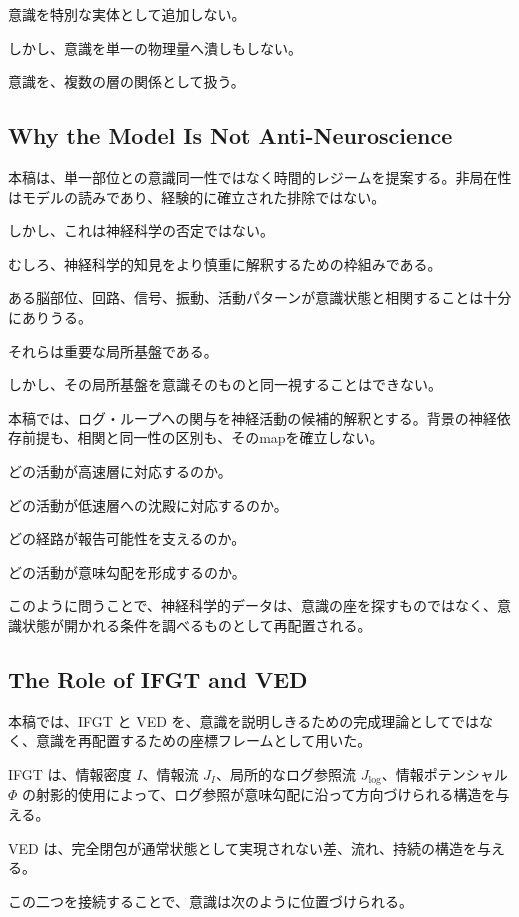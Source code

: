 意識を特別な実体として追加しない。

しかし、意識を単一の物理量へ潰しもしない。

意識を、複数の層の関係として扱う。

\subsection{Why the Model Is Not Anti-Neuroscience}

本稿は、単一部位との意識同一性ではなく時間的レジームを提案する。非局在性はモデルの読みであり、経験的に確立された排除ではない。

しかし、これは神経科学の否定ではない。

むしろ、神経科学的知見をより慎重に解釈するための枠組みである。

ある脳部位、回路、信号、振動、活動パターンが意識状態と相関することは十分にありうる。

それらは重要な局所基盤である。

しかし、その局所基盤を意識そのものと同一視することはできない。

本稿では、ログ・ループへの関与を神経活動の候補的解釈とする。背景の神経依存前提も、相関と同一性の区別も、そのmapを確立しない。

どの活動が高速層に対応するのか。

どの活動が低速層への沈殿に対応するのか。

どの経路が報告可能性を支えるのか。

どの活動が意味勾配を形成するのか。

このように問うことで、神経科学的データは、意識の座を探すものではなく、意識状態が開かれる条件を調べるものとして再配置される。

\subsection{The Role of IFGT and VED}

本稿では、IFGT と VED を、意識を説明しきるための完成理論としてではなく、意識を再配置するための座標フレームとして用いた。

IFGT は、情報密度 $I$、情報流 $J_I$、局所的なログ参照流 $J_{\log}$、情報ポテンシャル $\Phi$ の射影的使用によって、ログ参照が意味勾配に沿って方向づけられる構造を与える。

VED は、完全閉包が通常状態として実現されない差、流れ、持続の構造を与える。

この二つを接続することで、意識は次のように位置づけられる。


